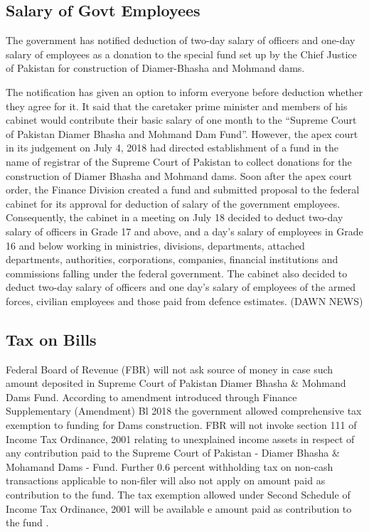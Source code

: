 \documentclass[11pt, journal,letterpaper,compsoc]{IEEEtran}
\begin{document}
\subsection{Salary of Govt Employees}
The government has notified ded­uction of two-day salary of officers and one-day salary of employees as a donation to the special fund set up by the Chief Justice of Pakistan for construction of Diamer-Bhasha and Mohmand dams.

The notification has given an option to inform everyone before deduction whether they agree for it.
It said that the caretaker prime minister and members of his cabinet would contribute their basic salary of one month to the “Supreme Court of Pakis­tan Diamer Bhasha and Mohmand Dam Fund”.
However, the apex court in its judgement on July 4, 2018 had directed establishment of a fund in the name of registrar of the Supreme Court of Pakistan to collect donations for the construction of Diamer Bhasha and Mohmand dams.
Soon after the apex court order, the Finance Division created a fund and submitted proposal to the federal cabinet for its approval for deduction of salary of the government employees. 
Consequently, the cabinet in a meeting on July 18 decided to deduct two-day salary of officers in Grade 17 and above, and a day’s salary of employees in Grade 16 and below working in ministries, divisions, dep­a­rtments, attached departments, authorities, corporations, companies, financial institutions and commissions falling under the federal government.
The cabinet also decided to deduct two-day salary of officers and one day’s salary of employees of the armed forces, civilian employees and those paid from defence estimates. (DAWN NEWS)


\subsection{Tax on Bills}
Federal Board of Revenue (FBR) will not ask source of money in case such amount deposited in Supreme Court of Pakistan Diamer Bhasha \& Mohmand Dams Fund.
According to amendment introduced through Finance Supplementary (Amendment) Bl 2018 the government allowed comprehensive tax exemption to funding for Dams construction. FBR will not invoke section 111 of Income Tax Ordinance, 2001 relating to unexplained income assets in respect of any contribution paid to the Supreme Court of Pakistan - Diamer Bhasha \& Mohamand Dams - Fund. Further 0.6 percent withholding tax on non-cash transactions applicable to non-filer will also not apply on amount paid as contribution to the fund. The tax exemption allowed under Second Schedule of Income Tax Ordinance, 2001 will be available e amount paid as contribution to the fund	.
	
\end{document}
